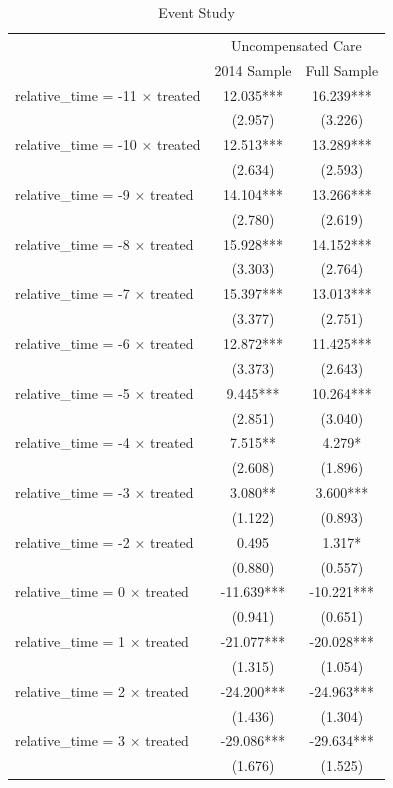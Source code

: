 \documentclass[
  12pt,
]{article}
\begin{document}
\begin{table}

\caption{\label{tab:Tab-3}Event Study}
\centering
\begin{tabular}[t]{lcc}
\toprule
\multicolumn{1}{c}{ } & \multicolumn{2}{c}{Uncompensated Care} \\
\cmidrule(l{3pt}r{3pt}){2-3}
  & 2014 Sample & Full Sample\\
\midrule
relative\_time = -11 × treated & 12.035*** & 16.239***\\
 & (2.957) & (3.226)\\
relative\_time = -10 × treated & 12.513*** & 13.289***\\
 & (2.634) & (2.593)\\
relative\_time = -9 × treated & 14.104*** & 13.266***\\
 & (2.780) & (2.619)\\
relative\_time = -8 × treated & 15.928*** & 14.152***\\
 & (3.303) & (2.764)\\
relative\_time = -7 × treated & 15.397*** & 13.013***\\
 & (3.377) & (2.751)\\
relative\_time = -6 × treated & 12.872*** & 11.425***\\
 & (3.373) & (2.643)\\
relative\_time = -5 × treated & 9.445*** & 10.264***\\
 & (2.851) & (3.040)\\
relative\_time = -4 × treated & 7.515** & 4.279*\\
 & (2.608) & (1.896)\\
relative\_time = -3 × treated & 3.080** & 3.600***\\
 & (1.122) & (0.893)\\
relative\_time = -2 × treated & 0.495 & 1.317*\\
 & (0.880) & (0.557)\\
relative\_time = 0 × treated & -11.639*** & -10.221***\\
 & (0.941) & (0.651)\\
relative\_time = 1 × treated & -21.077*** & -20.028***\\
 & (1.315) & (1.054)\\
relative\_time = 2 × treated & -24.200*** & -24.963***\\
 & (1.436) & (1.304)\\
relative\_time = 3 × treated & -29.086*** & -29.634***\\
 & (1.676) & (1.525)\\

\end{tabular}
\end{table}
\end{document}
